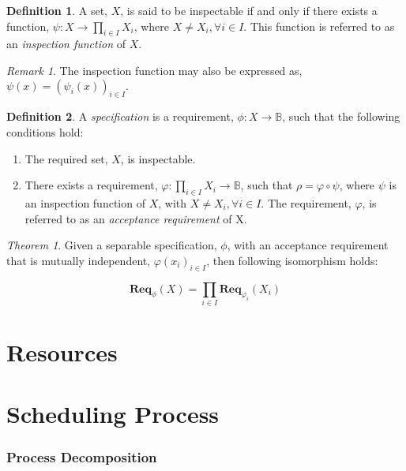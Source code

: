 \documentclass{article}
\theoremstyle{definition}
\newtheorem{definition}{Definition}[section]
\theoremstyle{remark}
\newtheorem*{remark}{Remark}
\newtheorem*{theorem}{Theorem}
\newcommand{\func}[3]{#1:#2\rightarrow#3}
\newcommand{\reqfunc}[2]{#1:#2\rightarrow\mathbb{B}}
\newcommand{\reqop}[2]{\mathbf{Req}_{#1}(#2)}
\begin{document}
		\begin{definition}
			A set, $X$, is said to be inspectable if and only if there exists a function, $\func{\psi}{X}{\prod_{i \in I}{X_{i}}}$, where $X \ne X_{i}, \forall i \in I$. This function is referred to as an \emph{inspection function} of $X$.
		\end{definition}
		
		\begin{remark}
			The inspection function may also be expressed as, $\psi(x) = (\psi_{i}(x))_{i \in I}.$
		\end{remark}
		
		\begin{definition}
			A \emph{specification} is a requirement, $\reqfunc{\phi}{X}$, such that the following conditions
			hold:
			
			\begin{enumerate}
				\item   The required set, $X$, is inspectable.
				
				\item   There exists a requirement, $\reqfunc{\varphi}{\prod_{i \in I}{X_{i}}}$,
				such that $\rho = \varphi \circ \psi$, where $\psi$ is an inspection function of $X$,
				with $X \ne X_{i}, \forall i \in I$. The requirement, $\varphi$, is referred to as an
				\emph{acceptance requirement} of X.
			\end{enumerate}
			
		\end{definition}
		
		\begin{theorem}
			Given a separable specification, $\phi$, with an acceptance requirement that is mutually independent,
			$\varphi(x_i)_{i \in I}$, then following isomorphism holds:
			
			\[
			\reqop{\phi}{X} = \prod_{i \in I}\reqop{\varphi_{i}}{X_{i}}
			\]
		\end{theorem}
	
	\newpage
	
	\part{Resources}
	
	\newpage
	
	\part{Scheduling Process}
	
	\section{Process Decomposition}
	
\end{document}
